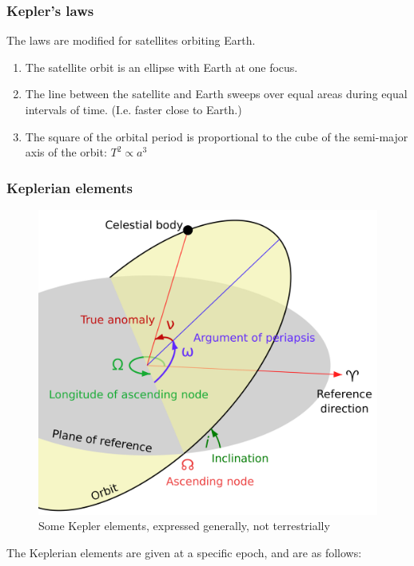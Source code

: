 \subsubsection{Kepler's laws}
The laws are modified for satellites orbiting Earth.

\begin{enumerate}
    \item The satellite orbit is an ellipse with Earth at one focus.
    \item The line between the satellite and Earth sweeps over equal areas during equal intervals of time. (I.e. faster close to Earth.)
    \item The square of the orbital period is proportional to the cube of the semi-major axis of the orbit: $T^2 \propto a^3$
\end{enumerate}



\subsubsection{Keplerian elements}

\begin{figure}[htbp]
    \centering
    \includegraphics[width=.9\linewidth]{img/kepler-elements.png}
    \caption{Some Kepler elements, expressed generally, not terrestrially}
    \label{fig:kepler}
\end{figure}

The Keplerian elements are given at a specific epoch, and are as follows:

